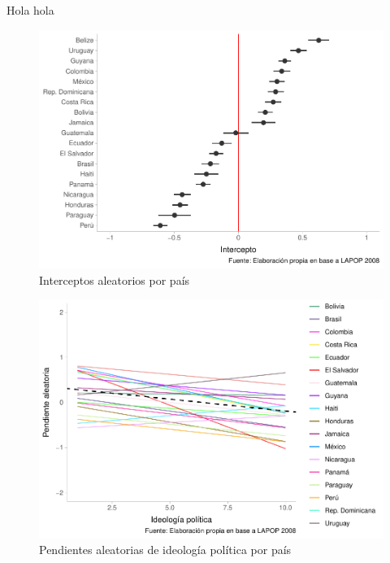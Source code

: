 \documentclass[
  12pt,
  a4paper,
]{article}
\begin{document}
Hola hola

\begin{figure}

{\centering \includegraphics{01-guia_files/figure-latex/fig1-1} 

}

\caption{Interceptos aleatorios por país}\label{fig:fig1}
\end{figure}

\begin{figure}

{\centering \includegraphics{01-guia_files/figure-latex/fig2-1} 

}

\caption{Pendientes aleatorias de ideología política por país}\label{fig:fig2}
\end{figure}
\end{document}
